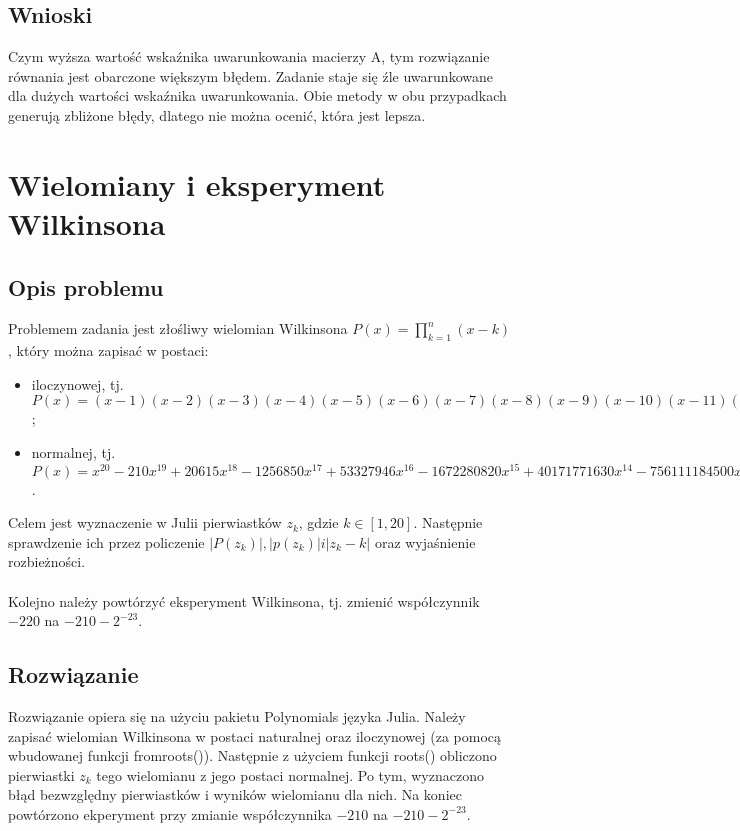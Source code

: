 \documentclass{article}
\begin{document}
\subsection{Wnioski}
Czym wyższa wartość wskaźnika uwarunkowania macierzy A, tym rozwiązanie równania jest obarczone większym błędem. Zadanie staje się źle uwarunkowane dla dużych wartości wskaźnika uwarunkowania. Obie metody w obu przypadkach generują zbliżone błędy, dlatego nie można ocenić, która jest lepsza.
\section{Wielomiany i eksperyment Wilkinsona}

\subsection{Opis problemu}
Problemem zadania jest złośliwy wielomian Wilkinsona $P(x) = \prod_{k=1}^{n} (x - k)$, który można zapisać w postaci:
\begin{itemize}
    \item iloczynowej, tj. $P(x) = (x - 1)(x - 2)(x - 3)(x - 4)(x - 5)(x - 6)(x - 7)(x - 8)(x - 9)(x - 10)(x - 11)(x - 12)(x - 13)(x - 14)(x - 15)(x - 16)(x - 17)(x - 18)(x - 19)(x - 20)$;
    \item normalnej, tj. $P(x) = x^{20} - 210x^{19} + 20615x^{18} - 1256850x^{17} + 53327946x^{16} - 1672280820x^{15} + 40171771630x^{14} - 756111184500x^{13} + 11310276995381x^{12} - 135585182899530x^{11} + 1307535010540395x^{10} - 10142299865511450x^{9} + 63030812099294896x^{8} - 311333643161390640x^{7} + 1206647803780373360x^{6} - 3599979517947607200x^{5} + 8037811822645051776x^{4} - 12870931245150988800x^{3} + 13803759753640704000x^{2} - 8752948036761600000x + 2432902008176640000$.
\end{itemize}
Celem jest wyznaczenie w Julii pierwiastków $z_k$, gdzie $k \in [1, 20]$. Następnie sprawdzenie ich przez policzenie $|P(z_k)|, |p(z_k)| i |z_k - k|$ oraz wyjaśnienie rozbieżności. 
\\ \\Kolejno należy powtórzyć eksperyment Wilkinsona, tj. zmienić współczynnik $-220$ na $-210-2^{-23}$.
\subsection{Rozwiązanie}
Rozwiązanie opiera się na użyciu pakietu Polynomials języka Julia. Należy zapisać wielomian Wilkinsona w postaci naturalnej oraz iloczynowej (za pomocą wbudowanej funkcji fromroots()). Następnie z użyciem funkcji roots() obliczono pierwiastki $z_k$ tego wielomianu z jego postaci normalnej. Po tym, wyznaczono błąd bezwzględny pierwiastków i wyników wielomianu dla nich. Na koniec powtórzono ekperyment przy zmianie współczynnika $-210$ na $-210 - 2^{-23} $. 
\end{document}
